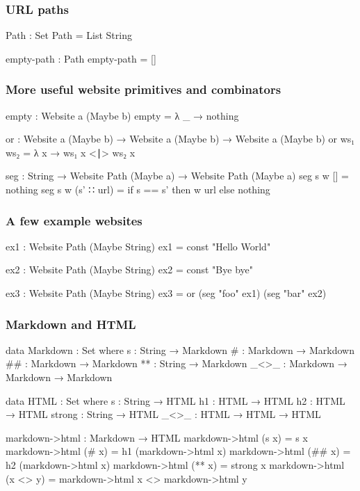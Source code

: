 \documentclass[aspectratio=169]{beamer}
\begin{document}
\begin{frame}
\frametitle{URL paths}
\begin{code}
  Path : Set
  Path = List String

  empty-path : Path
  empty-path = []
\end{code}
\end{frame}

\begin{frame}
\frametitle{More useful website primitives and combinators}
\begin{code}
  empty : Website a (Maybe b)
  empty = λ _ → nothing
  
  or : Website a (Maybe b) → Website a (Maybe b) → Website a (Maybe b)
  or ws₁ ws₂ = λ x → ws₁ x <∣> ws₂ x
  
  seg : String → Website Path (Maybe a) → Website Path (Maybe a)
  seg s w [] = nothing
  seg s w (s' ∷ url) = if s == s' then w url else nothing
\end{code}
\end{frame}

\begin{frame}
\frametitle{A few example websites}
\begin{code}
  ex1 : Website Path (Maybe String)
  ex1 = const "Hello World"
  
  ex2 : Website Path (Maybe String)
  ex2 = const "Bye bye"
  
  ex3 : Website Path (Maybe String)
  ex3 = or (seg "foo" ex1)
           (seg "bar" ex2)
\end{code}
\end{frame}

\begin{frame}
\frametitle{Markdown and HTML}
\begin{code}
  data Markdown : Set where
    s : String → Markdown
    # : Markdown → Markdown
    ## : Markdown → Markdown
    ** : String → Markdown
    _<>_ : Markdown → Markdown → Markdown
  
  data HTML : Set where
    s : String → HTML
    h1 : HTML → HTML
    h2 : HTML → HTML
    strong : String → HTML
    _<>_ : HTML → HTML → HTML

  markdown->html : Markdown → HTML
  markdown->html (s x) = s x
  markdown->html (# x) = h1 (markdown->html x)
  markdown->html (## x) = h2 (markdown->html x)
  markdown->html (** x) = strong x
  markdown->html (x <> y) = markdown->html x <> markdown->html y
\end{code}
\end{frame}
\end{document}
